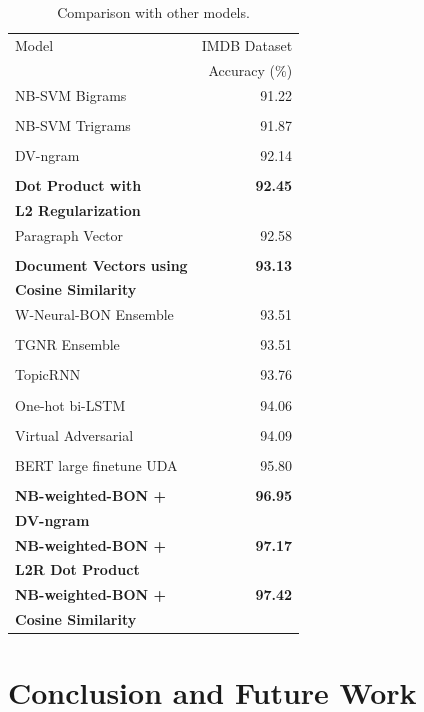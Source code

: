 \documentclass[11pt,a4paper]{article}
\begin{document}
\begin{table}[h]
	\centering
	\small
	\begin{tabular}{@{\hskip6pt}lr@{\hskip6pt}}
		\toprule
		Model & IMDB Dataset \\ 
		 & Accuracy (\%)\\
		\midrule
		NB-SVM Bigrams & 91.22  \\
		 \cite{wang2012}	& \\
		NB-SVM Trigrams & 91.87 \\
		\cite{mesnil2015} & \\
		DV-ngram  & 92.14 \\
		\cite{li2016a} & \\
		\bf{Dot Product with} & \bf{92.45} \\
		\bf{L2 Regularization} & \\ 
		Paragraph Vector & 92.58 \\
		\cite{le2014} & \\
		\bf{Document Vectors using} & \bf{93.13} \\
		\bf{Cosine Similarity} & \\
		W-Neural-BON Ensemble & 93.51 \\
		\cite{li2016b} & \\
		TGNR Ensemble & 93.51 \\
		\cite{li2017} & \\
		TopicRNN & 93.76 \\
		\cite{dieng2017} & \\
		One-hot bi-LSTM & 94.06 \\
		\cite{johnson2016} \\
		Virtual Adversarial & 94.09 \\
		\cite{miyato2016} & \\
		BERT large finetune UDA & 95.80\\
		\cite{xie2019} & \\
		\bf{NB-weighted-BON +} & \bf{96.95} \\
		\bf{DV-ngram} & \\
		\bf{NB-weighted-BON +} & \bf{97.17} \\
		\bf{L2R Dot Product} & \\
		\bf{NB-weighted-BON +} & \bf{97.42} \\
		\bf{Cosine Similarity} & \\
		\bottomrule
	\end{tabular}
	\caption{Comparison with other models.}
	\label{mc}
\end{table}

\section{Conclusion and Future Work}
\end{document}

